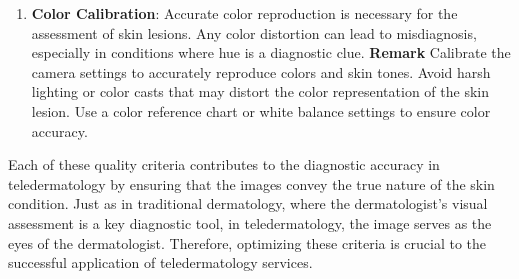 \begin{enumerate}
    \item \textbf{Color Calibration}:  Accurate color reproduction is necessary for the assessment of skin lesions. Any color distortion can lead to misdiagnosis, especially in conditions where hue is a diagnostic clue. \textbf{Remark} Calibrate the camera settings to accurately reproduce colors and skin tones. Avoid harsh lighting or color casts that may distort the color representation of the skin lesion. Use a color reference chart or white balance settings to ensure color accuracy.
\end{enumerate}
Each of these quality criteria contributes to the diagnostic accuracy in teledermatology by ensuring that the images convey the true nature of the skin condition. Just as in traditional dermatology, where the dermatologist's visual assessment is a key diagnostic tool, in teledermatology, the image serves as the eyes of the dermatologist. Therefore, optimizing these criteria is crucial to the successful application of teledermatology services.


